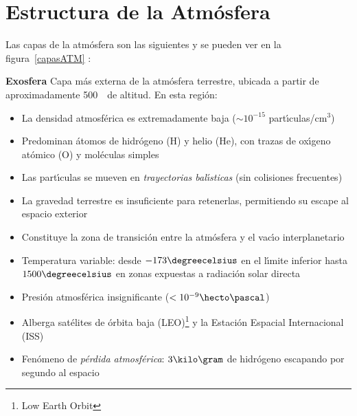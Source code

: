  \section{Estructura de la Atm\'osfera}
 \label{eatmos}
  Las capas de la atm\'osfera son las siguientes y se pueden ver en la figura~\ref{capasATM} :


\textbf{Exosfera}  Capa m\'as externa de la atm\'osfera terrestre, ubicada a partir de aproximadamente 500~\kilo\metre\ de altitud. En esta regi\'on:
\begin{itemize}
    \item La densidad atmosf\'erica es extremadamente baja ($\sim 10^{-15}$ part\'{\i}culas/cm$^3$)
    \item Predominan \'atomos de hidr\'ogeno (H) y helio (He), con trazas de ox\'{\i}geno at\'omico (O) y mol\'eculas simples
    \item Las part\'{\i}culas se mueven en \textit{trayectorias bal\'{\i}sticas} (sin colisiones frecuentes)
    \item La gravedad terrestre es insuficiente para retenerlas, permitiendo su escape al espacio exterior
    \item Constituye la zona de transici\'on entre la atm\'osfera y el vac\'{\i}o interplanetario
    \item Temperatura variable: desde $-173\degreecelsius$ en el l\'{\i}mite inferior hasta $1500\degreecelsius$ en zonas expuestas a radiaci\'on solar directa
    \item Presi\'on atmosf\'erica insignificante ($< 10^{-9}\hecto\pascal$)
    \item Alberga sat\'elites de \'orbita baja (LEO)\footnote{Low Earth Orbit} y la Estaci\'on Espacial Internacional (ISS)
    \item Fen\'omeno de \textit{p\'erdida atmosf\'erica}: $3 \kilo\gram$ de hidr\'ogeno escapando por segundo al espacio
\end{itemize}


